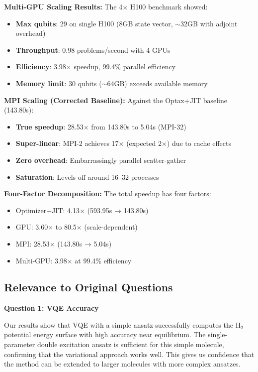 \documentclass[11pt]{article}
\begin{document}
\textbf{Multi-GPU Scaling Results:} The 4× H100 benchmark showed:
\begin{itemize}
    \item \textbf{Max qubits}: 29 on single H100 (8GB state vector, $\sim$32GB with adjoint overhead)
    \item \textbf{Throughput}: 0.98 problems/second with 4 GPUs
    \item \textbf{Efficiency}: 3.98× speedup, 99.4\% parallel efficiency
    \item \textbf{Memory limit}: 30 qubits ($\sim$64GB) exceeds available memory
\end{itemize}

\textbf{MPI Scaling (Corrected Baseline):} Against the Optax+JIT baseline (143.80s):
\begin{itemize}
    \item \textbf{True speedup}: 28.53× from 143.80s to 5.04s (MPI-32)
    \item \textbf{Super-linear}: MPI-2 achieves 17× (expected 2×) due to cache effects
    \item \textbf{Zero overhead}: Embarrassingly parallel scatter-gather
    \item \textbf{Saturation}: Levels off around 16--32 processes
\end{itemize}

\textbf{Four-Factor Decomposition:} The total speedup has four factors:
\begin{itemize}
    \item Optimizer+JIT: 4.13× (593.95s → 143.80s)
    \item GPU: 3.60× to 80.5× (scale-dependent)
    \item MPI: 28.53× (143.80s → 5.04s)
    \item Multi-GPU: 3.98× at 99.4\% efficiency
\end{itemize}

\subsection{Relevance to Original Questions}

\textbf{Question 1: VQE Accuracy}

Our results show that VQE with a simple ansatz successfully computes the H$_2$ potential energy surface with high accuracy near equilibrium. The single-parameter double excitation ansatz is sufficient for this simple molecule, confirming that the variational approach works well. This gives us confidence that the method can be extended to larger molecules with more complex ansatzes.
\end{document}
